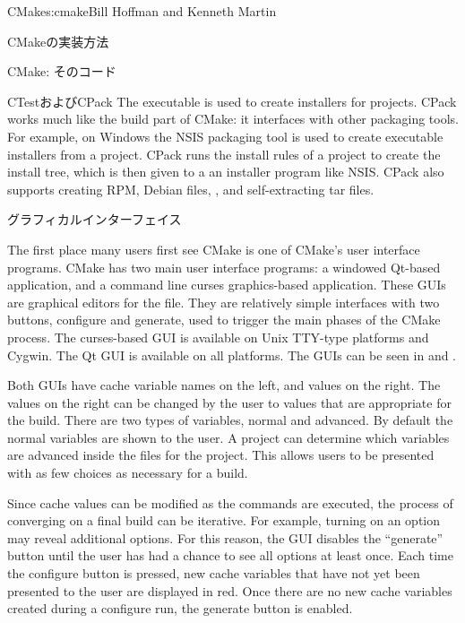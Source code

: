 \begin{aosachapter}{CMake}{s:cmake}{Bill Hoffman and Kenneth Martin}
\begin{aosasect1}{CMakeの実装方法}
\begin{aosasect2}{CMake: そのコード}
\begin{aosasect3}{CTestおよびCPack}
The  executable is used to create installers for
projects. CPack works much like the build part of CMake: it interfaces
with other packaging tools. For example, on Windows the NSIS packaging
tool is used to create executable installers from a project. CPack
runs the install rules of a project to create the install tree, which
is then given to a an installer program like NSIS\@.  CPack also
supports creating RPM, Debian  files, ,
 and self-extracting tar files.

\end{aosasect3}

\end{aosasect2}

\begin{aosasect2}{グラフィカルインターフェイス}

The first place many users first see CMake is one of CMake's user
interface programs. CMake has two main user interface programs:
a windowed Qt-based application, and a command line
curses graphics-based application. These GUIs are
graphical editors for the  file. They are
relatively simple interfaces with two buttons, configure and
generate, used to trigger the main phases of the CMake process. The
curses-based GUI is available on Unix TTY-type platforms and
Cygwin. The Qt GUI is available on all platforms.  The GUIs can be
seen in  and .



Both GUIs have cache variable names on the left, and values on the
right. The values on the right can be changed by the user to values
that are appropriate for the build. There are two types of
variables, normal and advanced. By default the normal variables are
shown to the user. A project can determine which variables are
advanced inside the  files for the project. This
allows users to be presented with as few choices as necessary for a
build.

Since cache values can be modified as the commands are executed, the
process of converging on a final build can be iterative. For example,
turning on an option may reveal additional options. For this reason,
the GUI disables the ``generate'' button until the user has had a
chance to see all options at least once. Each time the configure
button is pressed, new cache variables that have not yet been
presented to the user are displayed in red. Once there are
no new cache variables created during a configure run, the generate
button is enabled.


\end{aosasect2}
\end{aosasect1}
\end{aosachapter}
